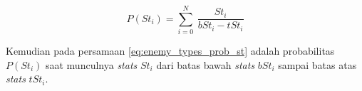 \begin{equation}\label{eq:enemy_types_prob_st}
P(St_{i}) = \sum_{i=0}^{N}\ \frac{St_{i}}{bSt_{i} - tSt_{i}}
\end{equation}

Kemudian pada persamaan \ref{eq:enemy_types_prob_st} adalah probabilitas $P(St_{i})$ saat munculnya \textit{stats} $St_{i}$ dari batas bawah \textit{stats} $bSt_{i}$ sampai batas atas \textit{stats} $tSt_{i}$.